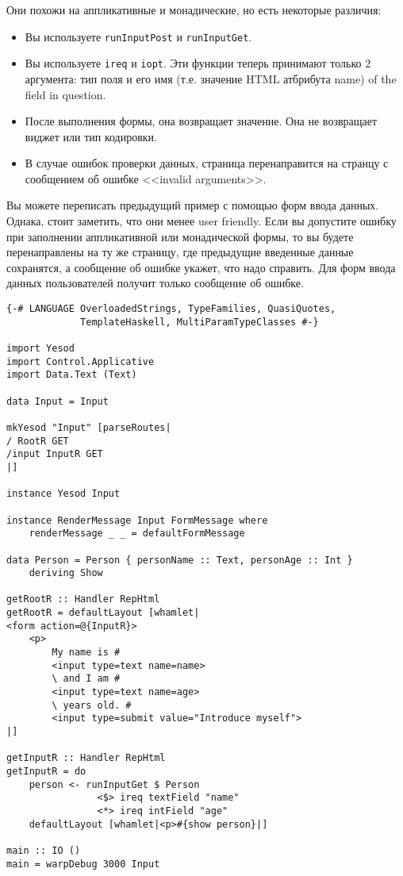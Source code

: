 Они похожи на аппликативные и монадические, но есть некоторые различия:
\begin{itemize}
 \item Вы используете \lstinline'runInputPost' и \lstinline'runInputGet'.
 \item Вы используете \lstinline'ireq' и \lstinline'iopt'. Эти функции теперь 
 принимают только 2 аргумента:
 тип поля и его имя (т.е. значение HTML атбрибута name) of the field in question.
 \item После выполнения формы, она возвращает значение. 
 Она не возвращает виджет или тип кодировки.
 \item В случае ошибок проверки данных, страница перенаправится на странцу 
 с сообщением об ошибке <<invalid arguments>>.
\end{itemize}
Вы можете переписать предыдущий пример с помощью форм ввода данных. Однака, стоит 
заметить, что они менее user friendly. Если вы допустите ошибку при заполнении 
аппликативной или монадической формы, то вы будете перенаправлены на ту же 
страницу, где предыдущие введенные данные сохранятся, а сообщение об ошибке 
укажет, что надо справить. Для форм ввода данных пользователей получит только 
сообщение об ошибке.

\begin{lstlisting}
{-# LANGUAGE OverloadedStrings, TypeFamilies, QuasiQuotes,
             TemplateHaskell, MultiParamTypeClasses #-}

import Yesod
import Control.Applicative
import Data.Text (Text)

data Input = Input

mkYesod "Input" [parseRoutes|
/ RootR GET
/input InputR GET
|]

instance Yesod Input

instance RenderMessage Input FormMessage where
    renderMessage _ _ = defaultFormMessage

data Person = Person { personName :: Text, personAge :: Int }
    deriving Show

getRootR :: Handler RepHtml
getRootR = defaultLayout [whamlet|
<form action=@{InputR}>
    <p>
        My name is #
        <input type=text name=name>
        \ and I am #
        <input type=text name=age>
        \ years old. #
        <input type=submit value="Introduce myself">
|]

getInputR :: Handler RepHtml
getInputR = do
    person <- runInputGet $ Person
                <$> ireq textField "name"
                <*> ireq intField "age"
    defaultLayout [whamlet|<p>#{show person}|]

main :: IO ()
main = warpDebug 3000 Input
\end{lstlisting}

